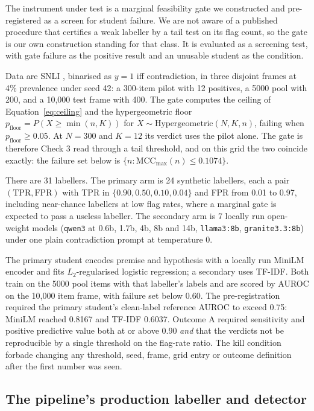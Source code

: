 \documentclass[review]{elsarticle}
\begin{document}
The instrument under test is a marginal feasibility gate we constructed and
pre-registered as a screen for student failure. We are not aware of a published procedure
that certifies a weak labeller by a tail test on its flag count, so the gate is our own construction standing for that class. It is evaluated as a screening test, with gate failure as the positive result
and an unusable student as the condition.

Data are SNLI \cite{bowman2015snli}, binarised as $y=1$ iff contradiction, in
three disjoint frames at 4\% prevalence under seed 42: a 300-item pilot with 12
positives, a 5000 pool with 200, and a 10,000 test frame with 400. The
gate computes the ceiling of Equation~\ref{eq:ceiling} and the hypergeometric
floor $p_{\text{floor}} = P(X \ge \min(n,K))$ for
$X \sim \mathrm{Hypergeometric}(N,K,n)$, failing when $p_{\text{floor}} \ge 0.05$.
At $N=300$ and $K=12$ its verdict uses the pilot alone. The gate is therefore
Check 3 read through a tail threshold, and on this grid the two coincide
exactly: the failure set below is $\{n : \mathrm{MCC}_{\max}(n) \le 0.1074\}$.

There are 31 labellers. The primary arm is 24 synthetic labellers, each a pair
$(\mathrm{TPR},\mathrm{FPR})$ with TPR in $\{0.90, 0.50, 0.10, 0.04\}$ and FPR
from 0.01 to 0.97, including near-chance labellers at low flag rates, where a
marginal gate is expected to pass a useless labeller. The secondary arm
is 7 locally run open-weight models (\texttt{qwen3} at 0.6b, 1.7b, 4b, 8b and
14b, \texttt{llama3:8b}, \texttt{granite3.3:8b}) under one plain contradiction
prompt at temperature 0.

The primary student encodes premise and hypothesis with a locally run MiniLM
encoder and fits $L_2$-regularised logistic regression; a secondary uses TF-IDF. Both train on
the 5000 pool items with that labeller's labels and are scored by AUROC on the
10,000 item frame, with failure set below 0.60. The pre-registration required the primary
student's clean-label reference AUROC to exceed 0.75: MiniLM reached 0.8167 and
TF-IDF 0.6037.
Outcome A required sensitivity and positive predictive value both at or above
0.90 \emph{and} that the verdicts not be reproducible by a single threshold on
the flag-rate ratio. The kill condition forbade changing any threshold, seed,
frame, grid entry or outcome definition after the first number was seen.

\subsection{The pipeline's production labeller and detector}
\label{sec:mat-pipeline}
\end{document}
